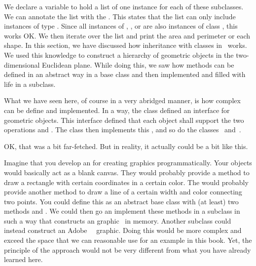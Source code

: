We declare a variable  to hold a list of one instance for each of these subclasses.
We can annotate the list with the  .
This  states that the list can only include instances of type .
Since all instances of , , or  are also instances of class , this works OK.
We then iterate over the list and print the area and perimeter or each shape.%
\endhsection%
%
%
In this section, we have discussed how inheritance with classes in \python\ works.
We used this knowledge to construct a hierarchy of geometric objects in the two-dimensional Euclidean plane.
While doing this, we saw how methods can be defined in an abstract way in a base class and then implemented and filled with life in a subclass.

What we have seen here, of course in a very abridged manner, is how complex  can be define and implemented.
In a way, the class  defined an interface for geometric objects.
This interface defined that each object shall support the two operations  and .
The class  then implements this , and so do the classes~ and~.

OK, that was a bit far-fetched.
But in reality, it actually could be a bit like this.

Imagine that you develop an  for creating graphics programmatically.
Your objects would basically act as a blank canvas.
They would probably provide a method to draw a rectangle with certain coordinates in a certain color.
The would probably provide another method to draw a line of a certain width and color connecting two points.
You could define this as an abstract base class with (at least) two methods  and .
We could then go an implement these methods in a subclass in such a way that constructs an  graphic~\cite{DDGLMSWFJJ2011SVGSSE} in memory.
Another subclass could instead construct an Adobe~~\cite{A2024WDPM,A2008P3DMPDFP1P1} graphic.
Doing this would be more complex and exceed the space that we can reasonable use for an example in this book.
Yet, the principle of the approach would not be very different from what you have already learned here.%
\endhsection%
%
\FloatBarrier%
\endhsection%
